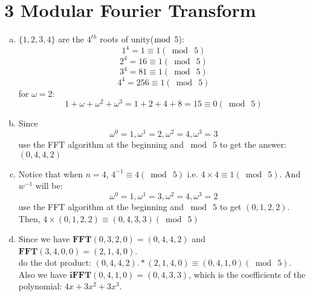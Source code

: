\documentclass[11pt]{article}
\newenvironment{qparts}{\begin{enumerate}[(a)]}{\end{enumerate}}
\begin{document}
	\section*{3 Modular Fourier Transform}
	\begin{qparts}
		\item $\{1,2,3,4\}$ are the $4^{th}$ roots of unity($\bmod$ 5):
		$$1^4 = 1 \equiv 1 (\bmod \ 5) $$
		$$2^4 = 16 \equiv 1 (\bmod \ 5) $$
		$$3^4 = 81 \equiv 1 (\bmod \ 5) $$
		$$4^4 = 256 \equiv 1 (\bmod \ 5) $$
		for $\omega = 2$:
		$$1 + \omega + \omega^2 + \omega^3 = 1 + 2 + 4 + 8 = 15 \equiv 0 (\bmod \ 5)$$
		
		\item Since
		$$\omega^0 = 1, \omega^1 = 2, \omega^2 = 4, \omega^3 = 3$$
		use the FFT algorithm at the beginning and $\bmod \ 5$ to get the answer: $(0,4,4,2)$
		
		\item Notice that when $n = 4$, $4^{-1} \equiv4(\bmod \ 5)$ i.e. $4 \times 4 \equiv 1(\bmod \ 5)$. And $w^{-1}$ will be:
		$$\omega^0 = 1, \omega^1 = 3, \omega^2 = 4, \omega^3 = 2$$
		use the FFT algorithm at the beginning and $\bmod \ 5$ to get  $(0,1,2,2)$.\\
		Then, $4\times (0,1,2,2) \equiv (0,4,3,3) (\bmod \ 5)$
		
		\item Since we have $\mathbf{FFT}(0,3,2,0) = (0,4,4,2)$ and $\mathbf{FFT}(3,4,0,0) = (2,1,4,0)$.\\
		do the dot product: $(0,4,4,2) .* (2,1,4,0) \equiv (0,4,1,0) (\bmod \ 5)$.\\
		Also we have $\mathbf{iFFT}(0,4,1,0) = (0,4,3,3)$, which is the coefficients of the polynomial: $4x + 3x^2 + 3x^3$.
	\end{qparts}
	
	\vspace{0.7cm}
	
\end{document}
